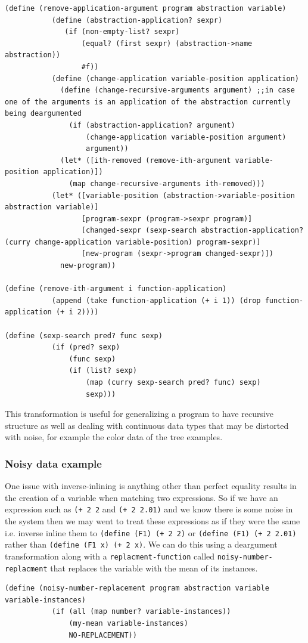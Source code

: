 \documentclass[a4paper,10pt]{article}
\begin{document}
\begin{lstlisting}[frame=trBL]
(define (remove-application-argument program abstraction variable)
           (define (abstraction-application? sexpr)
              (if (non-empty-list? sexpr)
                  (equal? (first sexpr) (abstraction->name abstraction))
                  #f))
           (define (change-application variable-position application)
             (define (change-recursive-arguments argument) ;;in case one of the arguments is an application of the abstraction currently being deargumented
               (if (abstraction-application? argument)
                   (change-application variable-position argument)
                   argument))
             (let* ([ith-removed (remove-ith-argument variable-position application)])
               (map change-recursive-arguments ith-removed)))
           (let* ([variable-position (abstraction->variable-position abstraction variable)]
                  [program-sexpr (program->sexpr program)]
                  [changed-sexpr (sexp-search abstraction-application? (curry change-application variable-position) program-sexpr)]
                  [new-program (sexpr->program changed-sexpr)])
             new-program))

(define (remove-ith-argument i function-application)
           (append (take function-application (+ i 1)) (drop function-application (+ i 2))))

(define (sexp-search pred? func sexp)
           (if (pred? sexp)
               (func sexp)
               (if (list? sexp)
                   (map (curry sexp-search pred? func) sexp)
                   sexp)))
\end{lstlisting}
This transformation is useful for generalizing a program to have recursive structure as well as dealing with continuous data types that may be distorted with noise, for example the color data of the tree examples.

\subsubsection{Noisy data example}
One issue with inverse-inlining is anything other than perfect equality results in the creation of a variable when matching two expressions.  So if we have an expression such as \texttt{(+ 2 2} and \texttt{(+ 2 2.01)} and we know there is some noise in the system then we may went to treat these expressions as if they were the same i.e. inverse inline them to \texttt{(define (F1) (+ 2 2)} or \texttt{(define (F1) (+ 2 2.01)} rather than \texttt{(define (F1 x) (+ 2 x)}.  We can do this using a deargument transformation along with a \texttt{replacment-function} called \texttt{noisy-number-replacment} that replaces the variable with the mean of its instances.  
\begin{lstlisting}[frame=trBL]
(define (noisy-number-replacement program abstraction variable variable-instances)
           (if (all (map number? variable-instances))
               (my-mean variable-instances)
               NO-REPLACEMENT))
\end{lstlisting}
\end{document}
